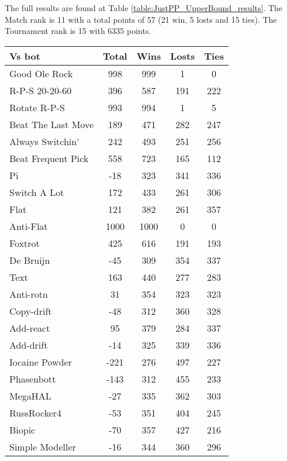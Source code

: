 The full results are found at Table \ref{table:JustPP_UpperBound_results}. The Match rank is 11 with a total points of 57 (21 win, 5 losts and 15 ties). The Tournament rank is 15 with 6335 points.

\begin{table*}
    \caption{HBSP (WS=1 to WS=29) Upper Bound results}
    \label{table:JustPP_UpperBound_results}
    \centering
    \begin{tabular}{|l|c|c|c|c|}
        \hline
        \textbf{Vs bot} & \textbf{Total} & \textbf{Wins} & \textbf{Losts} & \textbf{Ties} \\ \hline
Good Ole Rock & 998 & 999 & 1 & 0 \\ \hline 
R-P-S 20-20-60 & 396 & 587 & 191 & 222 \\ \hline 
Rotate R-P-S & 993 & 994 & 1 & 5 \\ \hline 
Beat The Last Move & 189 & 471 & 282 & 247 \\ \hline 
Always Switchin' & 242 & 493 & 251 & 256 \\ \hline 
Beat Frequent Pick & 558 & 723 & 165 & 112 \\ \hline 
Pi & -18 & 323 & 341 & 336 \\ \hline 
Switch A Lot & 172 & 433 & 261 & 306 \\ \hline 
Flat & 121 & 382 & 261 & 357 \\ \hline 
Anti-Flat & 1000 & 1000 & 0 & 0 \\ \hline 
Foxtrot & 425 & 616 & 191 & 193 \\ \hline 
De Bruijn & -45 & 309 & 354 & 337 \\ \hline 
Text & 163 & 440 & 277 & 283 \\ \hline 
Anti-rotn & 31 & 354 & 323 & 323 \\ \hline 
Copy-drift & -48 & 312 & 360 & 328 \\ \hline 
Add-react & 95 & 379 & 284 & 337 \\ \hline 
Add-drift & -14 & 325 & 339 & 336 \\ \hline 
Iocaine Powder & -221 & 276 & 497 & 227 \\ \hline 
Phasenbott & -143 & 312 & 455 & 233 \\ \hline 
MegaHAL & -27 & 335 & 362 & 303 \\ \hline 
RussRocker4 & -53 & 351 & 404 & 245 \\ \hline 
Biopic & -70 & 357 & 427 & 216 \\ \hline 
Simple Modeller & -16 & 344 & 360 & 296 \\ \hline 

\end{tabular}
\end{table*}
